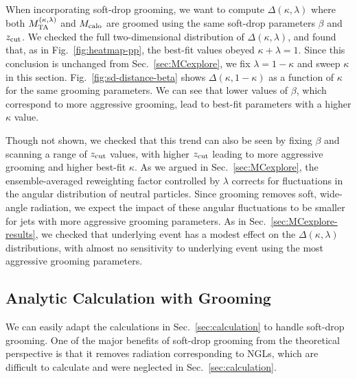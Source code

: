 \documentclass[letterpaper,11pt]{article}
\newcommand{\Fig}[1]{Fig.~\ref{#1}}
\newcommand{\Sec}[1]{Sec.~\ref{#1}}
\begin{document}
When incorporating soft-drop grooming, we want to compute $\Delta(\kappa,\lambda)$ where both $M_{\rm TA}^{(\kappa,\lambda)}$ and $M_{\rm calo}$ are groomed using the same soft-drop parameters $\beta$ and $z_{\rm cut}$.  
%
We checked the full two-dimensional distribution of $\Delta(\kappa,\lambda)$, and found that, as in \Fig{fig:heatmap-pp}, the best-fit values obeyed $\kappa + \lambda = 1$. 
%
Since this conclusion is unchanged from \Sec{sec:MCexplore}, we fix $\lambda = 1-\kappa$ and sweep $\kappa$ in this section. 
%
\Fig{fig:sd-distance-beta} shows $\Delta(\kappa,1-\kappa)$ as a function of $\kappa$ for the same grooming parameters.
%
We can see that lower values of $\beta$, which correspond to more aggressive grooming, lead to best-fit parameters with a higher $\kappa$ value. 


Though not shown, we checked that this trend can also be seen by fixing $\beta$ and scanning a range of $z_{\rm cut}$ values, with higher $z_{\rm cut}$ leading to more aggressive grooming and higher best-fit $\kappa$. 
%
As we argued in \Sec{sec:MCexplore}, the ensemble-averaged reweighting factor controlled by $\lambda$ corrects for fluctuations in the angular distribution of neutral particles. 
%
Since grooming removes soft, wide-angle radiation, we expect the impact of these angular fluctuations to be smaller for jets with more aggressive grooming parameters. 
%
As in \Sec{sec:MCexplore-results}, we checked that underlying event has a modest effect on the $\Delta(\kappa,\lambda)$ distributions, with almost no sensitivity to underlying event using the most aggressive grooming parameters.





\subsection{Analytic Calculation with Grooming}
\label{sec:sd-calculation}


We can easily adapt the calculations in \Sec{sec:calculation} to handle soft-drop grooming.
%
One of the major benefits of soft-drop grooming from the theoretical perspective is that it removes radiation corresponding to NGLs, which are difficult to calculate and were neglected in \Sec{sec:calculation}.
\end{document}
